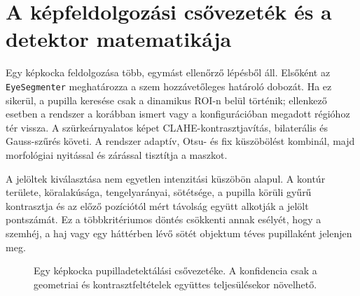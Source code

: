 \documentclass[12pt,a4paper,oneside]{book}
\begin{document}
\section{A képfeldolgozási csővezeték és a detektor matematikája}

Egy képkocka feldolgozása több, egymást ellenőrző lépésből áll. Elsőként az \texttt{EyeSegmenter} meghatározza a szem hozzávetőleges határoló dobozát. Ha ez sikerül, a pupilla keresése csak a dinamikus ROI-n belül történik; ellenkező esetben a rendszer a korábban ismert vagy a konfigurációban megadott régióhoz tér vissza. A szürkeárnyalatos képet CLAHE-kontrasztjavítás, bilaterális és Gauss-szűrés követi. A rendszer adaptív, Otsu- és fix küszöbölést kombinál, majd morfológiai nyitással és zárással tisztítja a maszkot.

A jelöltek kiválasztása nem egyetlen intenzitási küszöbön alapul. A kontúr területe, köralakúsága, tengelyarányai, sötétsége, a pupilla körüli gyűrű kontrasztja és az előző pozíciótól mért távolság együtt alkotják a jelölt pontszámát. Ez a többkritériumos döntés csökkenti annak esélyét, hogy a szemhéj, a haj vagy egy háttérben lévő sötét objektum téves pupillaként jelenjen meg.

\begin{figure}[H]
    \centering
    \caption{Egy képkocka pupilladetektálási csővezetéke. A konfidencia csak a geometriai és kontrasztfeltételek együttes teljesülésekor növelhető.}
    \label{fig:pupil_pipeline}
\end{figure}
\end{document}
